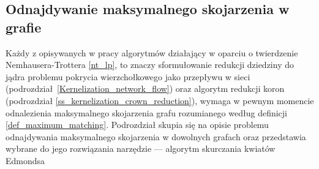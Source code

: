 \subsection{Odnajdywanie maksymalnego skojarzenia w grafie}\label{ss_edmonds}
\par{
  Każdy z opisywanych w pracy algorytmów działający w oparciu o twierdzenie\\Nemhausera-Trottera \ref{nt_lp}, to znaczy sformułowanie redukcji dziedziny do jądra problemu pokrycia wierzchołkowego jako przepływu w sieci (podrozdział \ref{Kernelization_network_flow}) oraz algorytm redukcji koron (podrozdział \ref{ss_kernelization_crown_reduction}), wymaga w pewnym momencie odnalezienia maksymalnego skojarzenia grafu rozumianego według definicji \ref{def_maximum_matching}.
  Podrozdział skupia się na opisie problemu odnajdywania maksymalnego skojarzenia w dowolnych grafach oraz przedstawia wybrane do jego rozwiązania narzędzie --- algorytm skurczania kwiatów Edmondsa
}

